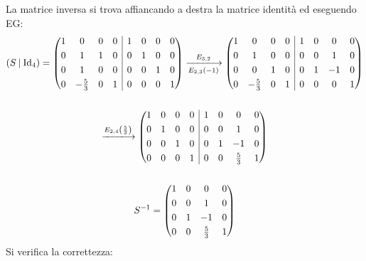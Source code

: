 \documentclass[a4paper]{article}
\makeatletter
\newenvironment{rowequmat}[1]{\left(\array{@{}#1@{}}}{\endarray\right)}
\makeatother
\begin{document}
	\noindent
	La matrice inversa si trova affiancando a destra la matrice identità ed eseguendo EG:
	\begin{gather*}
		\left(S \: | \: \mathrm{Id_{4}}\right) = 
		\begin{rowequmat}{cccc|cccc}
			1 & 0				& 0 & 0 & 1 & 0 & 0 & 0 \\ [.3em]
			0 & 1				& 1 & 0 & 0 & 1 & 0 & 0 \\ [.3em]
			0 & 1				& 0 & 0 & 0 & 0 & 1 & 0 \\ [.3em]
			0 & -\frac{5}{3}	& 0 & 1 & 0 & 0 & 0 & 1
		\end{rowequmat}
		\xlongrightarrow[E_{2,3}\left(-1\right)]{E_{3,2}}
		\begin{rowequmat}{cccc|cccc}
			1 & 0				& 0 & 0 & 1 & 0 & 0 & 0 \\ [.3em]
			0 & 1				& 0 & 0 & 0 & 0 & 1 & 0 \\ [.3em]
			0 & 0				& 1 & 0 & 0 & 1 & -1 & 0 \\ [.3em]
			0 & -\frac{5}{3}	& 0 & 1 & 0 & 0 & 0 & 1
		\end{rowequmat} \\
		\\
		\xlongrightarrow{E_{2,4}\left(\frac{5}{3}\right)}
		\begin{rowequmat}{cccc|cccc}
			1 & 0	& 0 & 0 & 1 & 0 & 0 & 0 \\ [.3em]
			0 & 1	& 0 & 0 & 0 & 0 & 1 & 0 \\ [.3em]
			0 & 0	& 1 & 0 & 0 & 1 & -1 & 0 \\ [.3em]
			0 & 0	& 0 & 1 & 0 & 0 & \frac{5}{3} & 1
		\end{rowequmat}\\
		\\
		S^{-1} = 
		\begin{rowequmat}{cccc}
			1 & 0 & 0 & 0 \\ [.3em]
			0 & 0 & 1 & 0 \\ [.3em]
			0 & 1 & -1 & 0 \\ [.3em]
			0 & 0 & \frac{5}{3} & 1
		\end{rowequmat}
	\end{gather*}
	Si verifica la correttezza:
\end{document}
